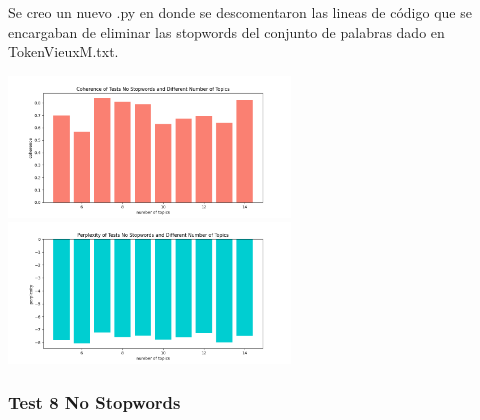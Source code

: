 \documentclass[10pt]{article} %
\begin{document}
	Se creo un nuevo .py en donde se descomentaron las lineas de c\'odigo que se encargaban de eliminar las stopwords del conjunto de palabras dado en TokenVieuxM.txt.
	
	\begin{center}
		\includegraphics[width=7.5cm]{images/coherence_no_stopwords}
		\includegraphics[width=7.5cm]{images/perplexity_no_stopwords}
	\end{center}

	\subsubsection{Test 8 No Stopwords}\label{test_8_ns_1}
	
\end{document}
